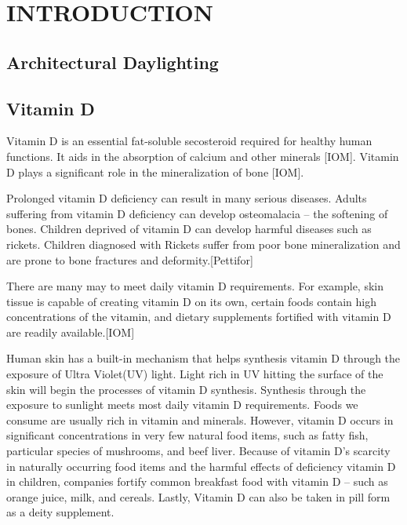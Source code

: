 \chapter{INTRODUCTION} \label{sec:introduction}

\section{Architectural Daylighting}

\section{Vitamin D}

Vitamin D is an essential fat-soluble secosteroid required for healthy human functions. It aids in the absorption of calcium and other minerals [IOM].  Vitamin D plays a significant role in the mineralization of bone [IOM].   

Prolonged vitamin D deficiency can result in many serious diseases.
 Adults suffering from vitamin D deficiency can develop osteomalacia -- the softening of bones. Children deprived of vitamin D can develop harmful diseases such as rickets. Children diagnosed with Rickets suffer from poor bone mineralization and are prone to bone fractures and deformity.[Pettifor] 

There are many may to meet daily vitamin D requirements. For example, skin tissue is capable of creating vitamin D on its own, certain foods contain high concentrations of the vitamin, and dietary supplements fortified with vitamin D are readily available.[IOM]

Human skin has a built-in mechanism that helps synthesis vitamin D through the exposure of Ultra Violet(UV) light. Light rich in UV hitting the surface of the skin will begin the processes of vitamin D synthesis. Synthesis through the exposure to sunlight meets most daily vitamin D requirements. Foods we consume are usually rich in vitamin and minerals. However, vitamin D occurs in significant concentrations in very few natural food items, such as fatty fish, particular species of mushrooms, and beef liver.  Because of vitamin D's scarcity in naturally occurring food items and the harmful effects of deficiency vitamin D  in children, companies fortify common breakfast food with vitamin D -- such as orange juice, milk, and cereals. Lastly, Vitamin D can also be taken in pill form as a deity supplement.

